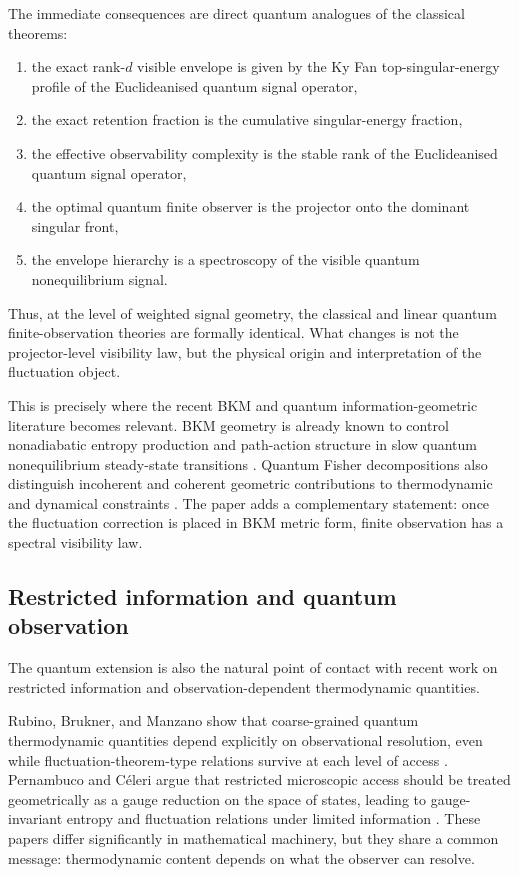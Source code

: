 \documentclass[11pt,a4paper]{article}
\numberwithin{equation}{section}
\theoremstyle{thmcompact}
\theoremstyle{remark}
\begin{document}
The immediate consequences are direct quantum analogues of the classical theorems:

\begin{enumerate}
\item the exact rank-\(d\) visible envelope is given by the Ky Fan top-singular-energy profile of the Euclideanised quantum signal operator,
\item the exact retention fraction is the cumulative singular-energy fraction,
\item the effective observability complexity is the stable rank of the Euclideanised quantum signal operator,
\item the optimal quantum finite observer is the projector onto the dominant singular front,
\item the envelope hierarchy is a spectroscopy of the visible quantum nonequilibrium signal.
\end{enumerate}

Thus, at the level of weighted signal geometry, the classical and linear quantum finite-observation theories are formally identical. What changes is not the projector-level visibility law, but the physical origin and interpretation of the fluctuation object.

This is precisely where the recent BKM and quantum information-geometric literature becomes relevant. BKM geometry is already known to control nonadiabatic entropy production and path-action structure in slow quantum nonequilibrium steady-state transitions \cite{LacerdaBettmannGoold2025}. Quantum Fisher decompositions also distinguish incoherent and coherent geometric contributions to thermodynamic and dynamical constraints \cite{BettmannGoold2025}. The paper adds a complementary statement: once the fluctuation correction is placed in BKM metric form, finite observation has a spectral visibility law.

\subsection{Restricted information and quantum observation}

The quantum extension is also the natural point of contact with recent work on restricted information and observation-dependent thermodynamic quantities.

Rubino, Brukner, and Manzano show that coarse-grained quantum thermodynamic quantities depend explicitly on observational resolution, even while fluctuation-theorem-type relations survive at each level of access \cite{RubinoBruknerManzano2025}. Pernambuco and Céleri argue that restricted microscopic access should be treated geometrically as a gauge reduction on the space of states, leading to gauge-invariant entropy and fluctuation relations under limited information \cite{PernambucoCeleri2026}. These papers differ significantly in mathematical machinery, but they share a common message: thermodynamic content depends on what the observer can resolve.
\end{document}
